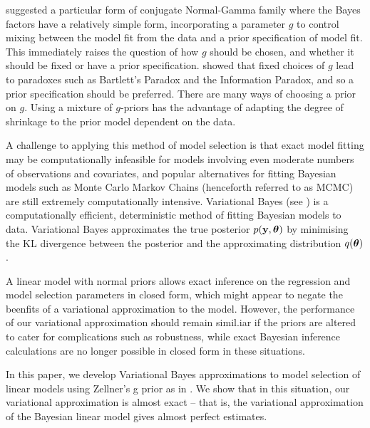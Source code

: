 \documentclass{amsart}[12pt]
\begin{document}
\citep{Zellner1980} suggested a particular form of conjugate Normal-Gamma family where the Bayes factors have a
relatively simple form, incorporating a parameter $g$ to control mixing between the model fit from the data
and a prior specification of model fit. This immediately raises the question of how $g$ should be chosen, and
whether it should be fixed or have a prior specification. \citep{Liang2008} showed that fixed choices of $g$
lead to paradoxes such as Bartlett's Paradox and the Information Paradox, and so a prior specification should
be preferred. There are many ways of choosing a prior on $g$. Using a mixture of $g$-priors has the advantage
of adapting the degree of shrinkage to the prior model dependent on the data.



A challenge to applying this method of model selection is that exact model fitting may be computationally
infeasible for models involving even moderate numbers of observations and covariates, and popular alternatives
for fitting Bayesian models such as Monte Carlo Markov Chains (henceforth referred to as MCMC) are still
extremely computationally intensive. Variational Bayes (see \citep{Ormerod2010}) is a computationally
efficient, deterministic method of fitting Bayesian models to data. Variational Bayes approximates the true
posterior $p({\bf y}, {\boldsymbol \theta})$ by minimising the KL divergence between the posterior and the  approximating
distribution $q({\boldsymbol \theta})$.

A linear model with normal priors allows exact inference on the regression and model selection parameters in
closed form, which might appear to negate the beenfits of a variational approximation to the model. However,
the performance of our variational approximation should remain simil.iar if the priors are altered to cater
for complications such as robustness, while exact Bayesian inference calculations are no longer possible
in closed form in these situations.






In this paper, we develop Variational Bayes approximations to model selection of linear models using Zellner's
g prior as in \citep{Liang2008}. We show that in this situation, our variational approximation is almost exact
-- that is, the variational approximation of the Bayesian linear model gives almost perfect estimates.
\end{document}
